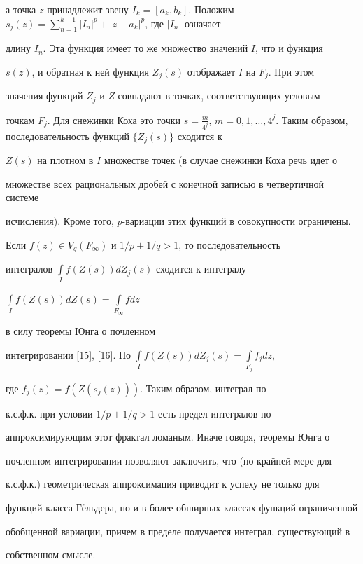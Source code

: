 а точка $z$ принадлежит звену $I_k = [a_k, b_k]$. Положим $s_j (z) =


\sum\limits_{n=1}^{k-1} |I_n|^p +| z - a_k|^p$, где $|I_n|$ означает


длину $I_n$. Эта функция имеет то же множество значений $I$, что и функция


$s(z)$, и обратная к ней функция $Z_j (s)$ отображает $I$ на $F_j$. При этом


значения функций $Z_j$ и $Z$ совпадают в точках, соответствующих угловым


точкам $F_j$. Для снежинки Коха это точки $s=\frac{m}{4^j}$, $m=0,1,\dotsc,


4^{j}$. Таким образом, последовательность функций $\{Z_j (s)\}$ сходится к


$Z(s)$ на плотном в $I$ множестве точек (в случае снежинки Коха речь идет о


множестве всех рациональных дробей с конечной записью в четвертичной системе


исчисления). Кроме того, $p$-вариации этих функций в совокупности ограничены.


Если $f(z)\in V_{q}(F_\infty)$ и $1/p + 1/q > 1$, то последовательность


интегралов $\int\limits_I f(Z(s))dZ_j (s)$ сходится к интегралу


$\int\limits_I f(Z(s))dZ(s)=\int\limits_{F_\infty}fdz$


в силу теоремы Юнга о почленном


интегрировании [15], [16]. Но $\int\limits_I f(Z(s))dZ_j (s) =


\int\limits_{F_j}f_j dz$,


где $f_j (z) = f(Z(s_j (z)))$. Таким образом, интеграл по


к.с.ф.к. при условии $1/p + 1/q > 1$ есть предел интегралов по


аппроксимирующим этот фрактал ломаным. Иначе говоря, теоремы Юнга о


почленном интегрировании позволяют заключить, что (по крайней мере для


к.с.ф.к.) геометрическая аппроксимация приводит к успеху не только для


функций класса Г\"ельдера, но и в более обширных классах функций ограниченной


обобщенной вариации, причем в пределе получается интеграл, существующий в


собственном смысле.





